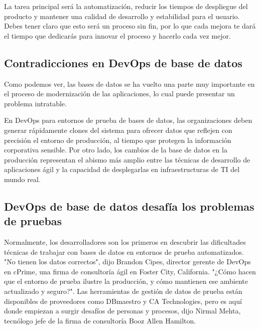 \documentclass[preprint,12pt]{elsarticle}
\begin{document}
La tarea principal será la automatización, reducir los tiempos de despliegue del producto y mantener una calidad de desarrollo y estabilidad para el usuario. Debes tener claro que esto será un proceso sin fin, por lo que cada mejora te dará el tiempo que dedicarás para innovar el proceso y hacerlo cada vez mejor.

\subsection{Contradicciones en DevOps de base de datos}
Como podemos ver, las bases de datos se ha vuelto una parte muy importante en el proceso de modernización de las aplicaciones, lo cual puede presentar un problema intratable.

En DevOps para entornos de prueba de bases de datos, las organizaciones deben generar rápidamente clones del sistema para ofrecer datos que reflejen con precisión el entorno de producción, al tiempo que protegen la información corporativa sensible. Por otro lado, los cambios de la base de datos en la producción representan el abismo más amplio entre las técnicas de desarrollo de aplicaciones ágil y la capacidad de desplegarlas en infraestructuras de TI del mundo real.\cite{DLake01}

\subsection{DevOps de base de datos desafía los problemas de pruebas}
Normalmente, los desarrolladores son los primeros en descubrir las dificultades técnicas de trabajar con bases de datos en entornos de prueba automatizados.
"No tienen los datos correctos", dijo Brandon Cipes, director gerente de DevOps en cPrime, una firma de consultoría ágil en Foster City, California. "¿Cómo hacen que el entorno de prueba ilustre la producción, y cómo mantienen ese ambiente actualizado y seguro?".
Las herramientas de gestión de datos de prueba están disponibles de proveedores como DBmaestro y CA Technologies, pero es aquí donde empiezan a surgir desafíos de personas y procesos, dijo Nirmal Mehta, tecnólogo jefe de la firma de consultoría Booz Allen Hamilton.
\end{document}
